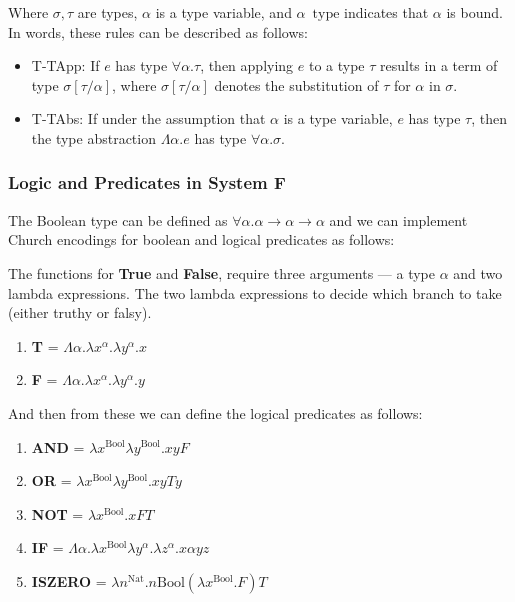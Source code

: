 \documentclass[11pt]{article}
\begin{document}
Where $\sigma,\tau$ are types, $\alpha$ is a type variable, and $\alpha \enspace \text{type}$ indicates that $\alpha$ is bound.
In words, these rules can be described as follows:
\begin{itemize}
    \item T-TApp: If $e$ has type $\forall \alpha.\tau$, then applying $e$ to a type $\tau$ results in a term of type $\sigma[\tau/\alpha]$, where $\sigma[\tau/\alpha]$ denotes the substitution of $\tau$ for $\alpha$ in $\sigma$.
    \item T-TAbs: If under the assumption that $\alpha$ is a type variable, $e$ has type $\tau$, then the type abstraction $\Lambda \alpha.e$ has type $\forall \alpha.\sigma$.
\end{itemize}

\subsubsection{Logic and Predicates in System F}
The Boolean type can be defined as $\forall \alpha.\alpha \to \alpha \to \alpha$ and we can implement Church encodings
for boolean and logical predicates as follows:

The functions for \textbf{True} and \textbf{False}, require three arguments --- a type $\alpha$ and two lambda expressions.
The two lambda expressions to decide which branch to take (either truthy or falsy).

\begin{enumerate}
    \item \textbf{T} = $\Lambda \alpha.\lambda x^\alpha.\lambda y^\alpha.x$
    \item \textbf{F} = $\Lambda \alpha.\lambda x^\alpha.\lambda y^\alpha.y$
\end{enumerate}

And then from these we can define the logical predicates as follows:
\begin{enumerate}
    \item \textbf{AND} = $\lambda x^{\text{Bool}}\lambda y^{\text{Bool}}.xy F$
    \item \textbf{OR} = $\lambda x^{\text{Bool}}\lambda y^{\text{Bool}}.xy T y$
    \item \textbf{NOT} = $\lambda x^{\text{Bool}}.x F T$
    \item \textbf{IF} = $\Lambda \alpha.\lambda x^{\text{Bool}}\lambda y^\alpha.\lambda z^\alpha.x \alpha yz$
    \item \textbf{ISZERO} = $\lambda n^{\text{Nat}}.n \text{Bool} (\lambda x^{\text{Bool}}.F) T$
\end{enumerate}
\end{document}
